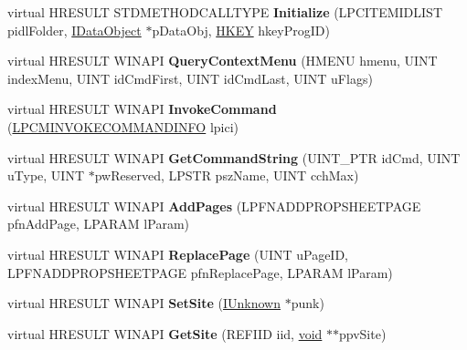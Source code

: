 \begin{DoxyCompactItemize}
\item 
\mbox{\label{class_c_drv_def_ext_aa3b37e440e6f2120adac6fd645f991a6}} 
virtual H\+R\+E\+S\+U\+LT S\+T\+D\+M\+E\+T\+H\+O\+D\+C\+A\+L\+L\+T\+Y\+PE {\bfseries Initialize} (L\+P\+C\+I\+T\+E\+M\+I\+D\+L\+I\+ST pidl\+Folder, \hyperlink{interface_i_data_object}{I\+Data\+Object} $\ast$p\+Data\+Obj, \hyperlink{interfacevoid}{H\+K\+EY} hkey\+Prog\+ID)
\item 
\mbox{\label{class_c_drv_def_ext_ae6d3ab1022edd634f7edd0b838d872d4}} 
virtual H\+R\+E\+S\+U\+LT W\+I\+N\+A\+PI {\bfseries Query\+Context\+Menu} (H\+M\+E\+NU hmenu, U\+I\+NT index\+Menu, U\+I\+NT id\+Cmd\+First, U\+I\+NT id\+Cmd\+Last, U\+I\+NT u\+Flags)
\item 
\mbox{\label{class_c_drv_def_ext_a9dfd522c546f95198e51ed2f6d01c0e0}} 
virtual H\+R\+E\+S\+U\+LT W\+I\+N\+A\+PI {\bfseries Invoke\+Command} (\hyperlink{struct_i_context_menu_1_1tag_c_m_i_n_v_o_k_e_c_o_m_m_a_n_d_i_n_f_o}{L\+P\+C\+M\+I\+N\+V\+O\+K\+E\+C\+O\+M\+M\+A\+N\+D\+I\+N\+FO} lpici)
\item 
\mbox{\label{class_c_drv_def_ext_a72d5428249c43092e9e0b7d89f154722}} 
virtual H\+R\+E\+S\+U\+LT W\+I\+N\+A\+PI {\bfseries Get\+Command\+String} (U\+I\+N\+T\+\_\+\+P\+TR id\+Cmd, U\+I\+NT u\+Type, U\+I\+NT $\ast$pw\+Reserved, L\+P\+S\+TR psz\+Name, U\+I\+NT cch\+Max)
\item 
\mbox{\label{class_c_drv_def_ext_ad79ade05959eb6018facbbfa5505a470}} 
virtual H\+R\+E\+S\+U\+LT W\+I\+N\+A\+PI {\bfseries Add\+Pages} (L\+P\+F\+N\+A\+D\+D\+P\+R\+O\+P\+S\+H\+E\+E\+T\+P\+A\+GE pfn\+Add\+Page, L\+P\+A\+R\+AM l\+Param)
\item 
\mbox{\label{class_c_drv_def_ext_abf3deb2f4bcd9737d681373687eeffb5}} 
virtual H\+R\+E\+S\+U\+LT W\+I\+N\+A\+PI {\bfseries Replace\+Page} (U\+I\+NT u\+Page\+ID, L\+P\+F\+N\+A\+D\+D\+P\+R\+O\+P\+S\+H\+E\+E\+T\+P\+A\+GE pfn\+Replace\+Page, L\+P\+A\+R\+AM l\+Param)
\item 
\mbox{\label{class_c_drv_def_ext_ac3ea6202ecbc85b7e5ff7588f72c2f6c}} 
virtual H\+R\+E\+S\+U\+LT W\+I\+N\+A\+PI {\bfseries Set\+Site} (\hyperlink{interface_i_unknown}{I\+Unknown} $\ast$punk)
\item 
\mbox{\label{class_c_drv_def_ext_ab0b9c3af7a3040706147c5645ac92771}} 
virtual H\+R\+E\+S\+U\+LT W\+I\+N\+A\+PI {\bfseries Get\+Site} (R\+E\+F\+I\+ID iid, \hyperlink{interfacevoid}{void} $\ast$$\ast$ppv\+Site)
\end{DoxyCompactItemize}
